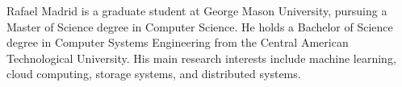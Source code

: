 \documentclass[11pt]{report}
\begin{document}
\startofchapters









\appendix
\appendixeqnumbering
% 
% 
% 
% 
% 






\biography

\noindent Rafael Madrid is a graduate student at George Mason University, pursuing a Master of Science degree in Computer Science. He holds a Bachelor of Science degree in Computer Systems Engineering from the Central American Technological University. His main research interests include machine learning, cloud computing, storage systems, and distributed systems. 
\end{document}
